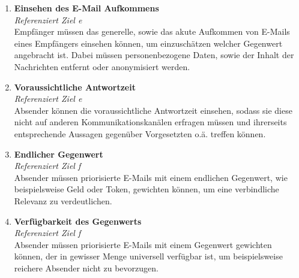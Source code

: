 \begin{enumerate}[label=(\alph*)]
    \item \textbf{Einsehen des E-Mail Aufkommens}\\
    \textit{Referenziert Ziel e} \\
        Empfänger müssen das generelle, sowie das akute Aufkommen von E-Mails eines Empfängers einsehen können, um einzuschätzen welcher Gegenwert angebracht ist. Dabei müssen personenbezogene Daten, sowie der Inhalt der Nachrichten entfernt oder anonymisiert werden. 
        
    \item \textbf{Voraussichtliche Antwortzeit}\\
    \textit{Referenziert Ziel e} \\
        Absender können die voraussichtliche Antwortzeit einsehen, sodass sie diese nicht auf anderen Kommunikationskanälen erfragen müssen und ihrerseits entsprechende Aussagen gegenüber Vorgesetzten o.ä. treffen können. 
        
    \item \textbf{Endlicher Gegenwert}\\
    \textit{Referenziert Ziel f} \\
        Absender müssen priorisierte E-Mails mit einem endlichen Gegenwert, wie beispielsweise Geld oder Token, gewichten können, um eine verbindliche Relevanz zu verdeutlichen.
        
    \item \textbf{Verfügbarkeit des Gegenwerts}\\
    \textit{Referenziert Ziel f} \\
        Absender müssen priorisierte E-Mails mit einem Gegenwert gewichten können, der in gewisser Menge universell verfügbar ist, um beispielsweise reichere Absender nicht zu bevorzugen.  
\end{enumerate}